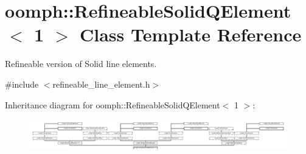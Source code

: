 \hypertarget{classoomph_1_1RefineableSolidQElement_3_011_01_4}{}\section{oomph\+:\+:Refineable\+Solid\+Q\+Element$<$ 1 $>$ Class Template Reference}
\label{classoomph_1_1RefineableSolidQElement_3_011_01_4}


Refineable version of Solid line elements.  




{\ttfamily \#include $<$refineable\+\_\+line\+\_\+element.\+h$>$}

Inheritance diagram for oomph\+:\+:Refineable\+Solid\+Q\+Element$<$ 1 $>$\+:\begin{figure}[H]
\begin{center}
\leavevmode
\includegraphics[height=1.423729cm]{classoomph_1_1RefineableSolidQElement_3_011_01_4}
\end{center}
\end{figure}
